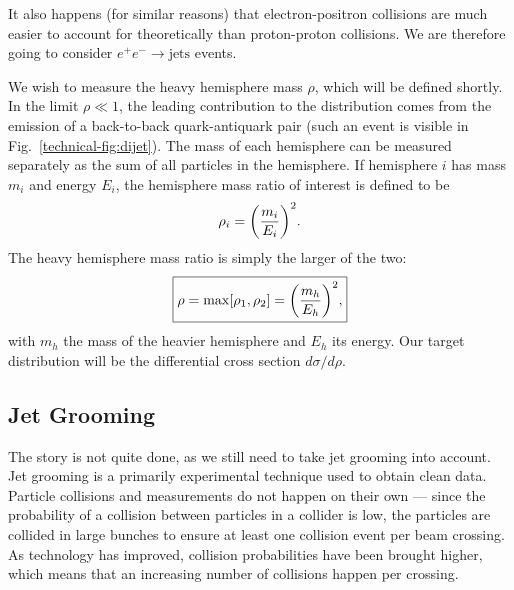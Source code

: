 \documentclass[../thesis.tex]{subfiles}
\begin{document}
	It also happens (for similar reasons) that electron-positron collisions are much easier to account for theoretically than proton-proton collisions. We are therefore going to consider $e^+ e^- \to \text{jets}$ events.

	We wish to measure the heavy hemisphere mass $\rho$, which will be defined shortly. In the limit $\rho \ll 1$, the leading contribution to the distribution comes from the emission of a back-to-back quark-antiquark pair (such an event is visible in Fig.~\ref{technical-fig:dijet}). The mass of each hemisphere can be measured separately as the sum of all particles in the hemisphere. If hemisphere $i$ has mass $m_i$ and energy $E_i$, the hemisphere mass ratio of interest is defined to be
	\begin{equation}
		\rho_i = \qty(\frac{m_i}{E_i})^2.
	\end{equation}
	The heavy hemisphere mass ratio is simply the larger of the two:
	\begin{equation}\label{technical-eq:rho definition}
	\boxed{
		\rho = \max[\rho_1, \rho_2] = \qty(\frac{m_h}{E_h})^2,
	}
	\end{equation}
	with $m_h$ the mass of the heavier hemisphere and $E_h$ its energy. Our target distribution will be the differential cross section $d\sigma/d\rho$.

\subsection{Jet Grooming}
	The story is not quite done, as we still need to take jet grooming into account. Jet grooming is a primarily experimental technique used to obtain clean data. Particle collisions and measurements do not happen on their own --- since the probability of a collision between particles in a collider is low, the particles are collided in large bunches to ensure at least one collision event per beam crossing. As technology has improved, collision probabilities have been brought higher, which means that an increasing number of collisions happen per crossing. 
\end{document}
